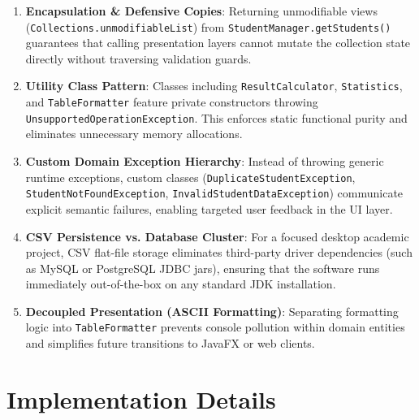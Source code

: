 \documentclass[12pt,a4paper]{report}
\begin{document}
\begin{enumerate}
    \item \textbf{Encapsulation \& Defensive Copies}: Returning unmodifiable views (\texttt{Collections.unmodifiableList}) from \texttt{StudentManager.getStudents()} guarantees that calling presentation layers cannot mutate the collection state directly without traversing validation guards.
    \item \textbf{Utility Class Pattern}: Classes including \texttt{ResultCalculator}, \texttt{Statistics}, and \texttt{TableFormatter} feature private constructors throwing \texttt{UnsupportedOperationException}. This enforces static functional purity and eliminates unnecessary memory allocations.
    \item \textbf{Custom Domain Exception Hierarchy}: Instead of throwing generic runtime exceptions, custom classes (\texttt{DuplicateStudentException}, \texttt{StudentNotFoundException}, \texttt{InvalidStudentDataException}) communicate explicit semantic failures, enabling targeted user feedback in the UI layer.
    \item \textbf{CSV Persistence vs. Database Cluster}: For a focused desktop academic project, CSV flat-file storage eliminates third-party driver dependencies (such as MySQL or PostgreSQL JDBC jars), ensuring that the software runs immediately out-of-the-box on any standard JDK installation.
    \item \textbf{Decoupled Presentation (ASCII Formatting)}: Separating formatting logic into \texttt{TableFormatter} prevents console pollution within domain entities and simplifies future transitions to JavaFX or web clients.
\end{enumerate}

\chapter{Implementation Details}
\end{document}
